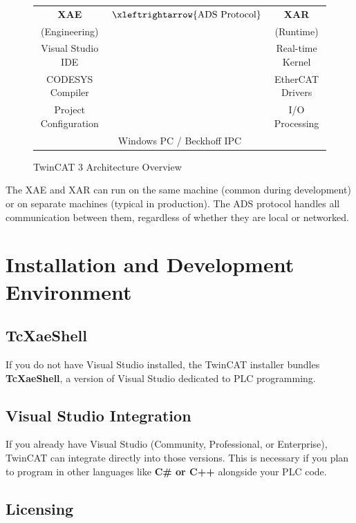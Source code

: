 \documentclass[11pt,a4paper]{article}
\begin{document}
\begin{figure}[h]
\centering
\begin{tabular}{|c|c|c|}
\hline
\textbf{XAE} & $\xleftrightarrow{\text{ADS Protocol}}$ & \textbf{XAR} \\
(Engineering) & & (Runtime) \\
\hline
Visual Studio IDE & & Real-time Kernel \\
CODESYS Compiler & & EtherCAT Drivers \\
Project Configuration & & I/O Processing \\
\hline
\multicolumn{3}{|c|}{Windows PC / Beckhoff IPC} \\
\hline
\end{tabular}
\caption{TwinCAT 3 Architecture Overview}
\end{figure}

\begin{tipbox}
The XAE and XAR can run on the same machine (common during development) or on separate machines (typical in production). The ADS protocol handles all communication between them, regardless of whether they are local or networked.
\end{tipbox}

\section{Installation and Development Environment}

\subsection{TcXaeShell}

If you do not have Visual Studio installed, the TwinCAT installer bundles \textbf{TcXaeShell}, a version of Visual Studio dedicated to PLC programming.

\subsection{Visual Studio Integration}

If you already have Visual Studio (Community, Professional, or Enterprise), TwinCAT can integrate directly into those versions. This is necessary if you plan to program in other languages like \textbf{C\# or C++} alongside your PLC code.

\subsection{Licensing}
\end{document}
